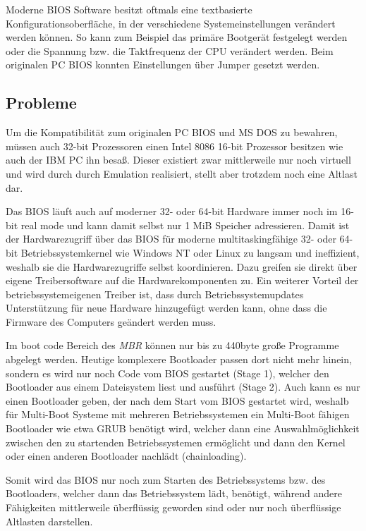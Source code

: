 \documentclass[12pt,ngerman,twopage]{scrartcl}
\begin{document}
Moderne BIOS Software besitzt oftmals eine textbasierte Konfigurationsoberfläche, in der verschiedene Systemeinstellungen verändert werden können. So kann zum Beispiel das primäre Bootgerät festgelegt werden oder die Spannung bzw. die Taktfrequenz der CPU verändert werden. Beim originalen PC BIOS konnten Einstellungen über Jumper gesetzt werden.
\subsection{Probleme}
Um die Kompatibilität zum originalen PC BIOS und MS DOS zu bewahren, müssen auch 32-bit Prozessoren einen Intel 8086 16-bit Prozessor besitzen wie auch der IBM PC ihn besaß. Dieser existiert zwar mittlerweile nur noch virtuell und wird durch durch Emulation realisiert, stellt aber trotzdem noch eine Altlast dar.

Das BIOS läuft auch auf moderner 32- oder 64-bit Hardware immer noch im 16-bit real mode und kann damit selbst nur 1 MiB Speicher adressieren. Damit ist der Hardwarezugriff über das BIOS für moderne multitaskingfähige 32- oder 64-bit Betriebssystemkernel wie Windows NT oder Linux zu langsam und ineffizient, weshalb sie die Hardwarezugriffe selbst koordinieren. Dazu greifen sie direkt über eigene Treibersoftware auf die Hardwarekomponenten zu. Ein weiterer Vorteil der betriebssystemeigenen Treiber ist, dass durch Betriebssystemupdates Unterstützung für neue Hardware hinzugefügt werden kann, ohne dass die Firmware des Computers geändert werden muss.

Im boot code Bereich des \textit{MBR} können nur bis zu 440byte große Programme abgelegt werden. Heutige komplexere Bootloader passen dort nicht mehr hinein, sondern es wird nur noch Code vom BIOS gestartet (Stage 1), welcher den Bootloader aus einem Dateisystem liest und ausführt (Stage 2). Auch kann es nur einen Bootloader geben, der nach dem Start vom BIOS gestartet wird, weshalb für Multi-Boot Systeme mit mehreren Betriebssystemen ein Multi-Boot fähigen Bootloader wie etwa GRUB benötigt wird, welcher dann eine Auswahlmöglichkeit zwischen den zu startenden Betriebssystemen ermöglicht und dann den Kernel oder einen anderen Bootloader nachlädt (chainloading).

Somit wird das BIOS nur noch zum Starten des Betriebssystems bzw. des Bootloaders, welcher dann das Betriebssystem lädt, benötigt, während andere Fähigkeiten mittlerweile überflüssig geworden sind oder nur noch überflüssige Altlasten darstellen.
\end{document}
